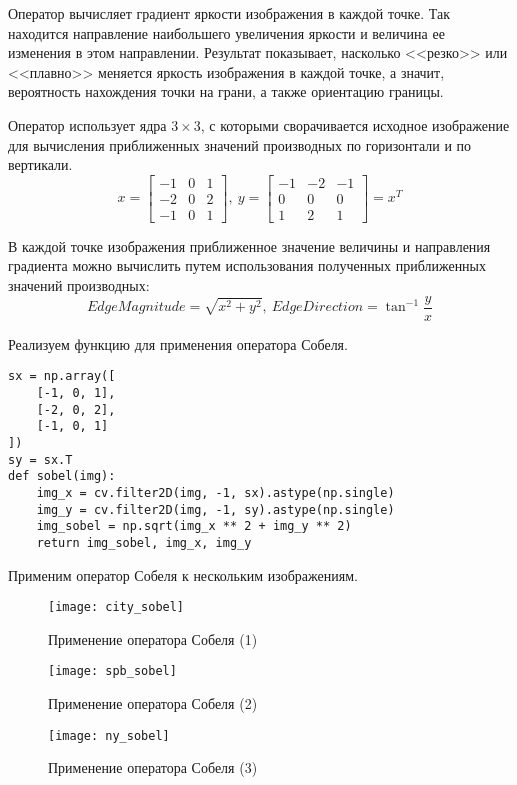 Оператор вычисляет градиент яркости изображения в каждой точке. Так находится направление наибольшего увеличения яркости и величина ее изменения в этом направлении. Результат показывает, насколько <<резко>> или <<плавно>> меняется яркость изображения в каждой точке, а значит, вероятность нахождения точки на грани, а также ориентацию границы.

Оператор использует ядра $3 \times 3$, с которыми сворачивается исходное изображение для вычисления приближенных значений производных по горизонтали и по вертикали.
$$
x = \begin{bmatrix}
-1 & 0 & 1 \\
-2 & 0 & 2 \\
-1 & 0 & 1
\end{bmatrix},\ 
y = \begin{bmatrix}
-1 & -2 & -1 \\
0  & 0  & 0 \\
1  & 2  & 1
\end{bmatrix} = x^T
$$

В каждой точке изображения приближенное значение величины и направления градиента можно вычислить путем использования полученных приближенных значений производных:
$$
Edge Magnitude = \sqrt{x^2 + y^2},\ Edge Direction = \tan^{-1}\frac{y}{x}
$$

Реализуем функцию для применения оператора Собеля.

\begin{lstlisting}[caption={Применение оператора Собеля}]
sx = np.array([
    [-1, 0, 1],
    [-2, 0, 2],
    [-1, 0, 1]
])
sy = sx.T
def sobel(img):
    img_x = cv.filter2D(img, -1, sx).astype(np.single)
    img_y = cv.filter2D(img, -1, sy).astype(np.single)
    img_sobel = np.sqrt(img_x ** 2 + img_y ** 2)
    return img_sobel, img_x, img_y
\end{lstlisting}

Применим оператор Собеля к нескольким изображениям.

\begin{figure}[H]
	\centering
	\texttt{[image: city\_sobel]}
	\caption{Применение оператора Собеля (1)}
\end{figure}

\begin{figure}[H]
	\centering
	\texttt{[image: spb\_sobel]}
	\caption{Применение оператора Собеля (2)}
\end{figure}

\begin{figure}[H]
	\centering
	\texttt{[image: ny\_sobel]}
	\caption{Применение оператора Собеля (3)}
\end{figure}

